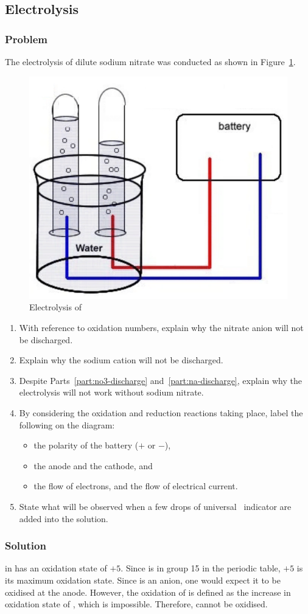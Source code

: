 \documentclass[12pt, a4paper, twoside]{pancake-book}
\begin{document}
\subsection{Electrolysis}
\subsubsection{Problem}
The electrolysis of dilute sodium nitrate was conducted as shown in Figure~\ref{fig:electrolysis-nano3}.
\begin{figure}[htpb]
	\centering
	\includegraphics[width=0.4\linewidth]{assets/09_electrolysis_nano3.png}
	\caption{Electrolysis of }
	\label{fig:electrolysis-nano3}
\end{figure}
\begin{enumerate}
	\item\label{part:no3-discharge} With reference to oxidation numbers, explain why the nitrate anion will not be discharged.
	\item\label{part:na-discharge} Explain why the sodium cation will not be discharged.
	\item Despite Parts~\ref{part:no3-discharge} and~\ref{part:na-discharge}, explain why
	      the electrolysis will not work without sodium nitrate.
	\item By considering the oxidation and reduction reactions taking place, label the following on the diagram:
	      \begin{itemize}
		      \item the polarity of the battery (\(+\) or \(-\)),
		      \item the anode and the cathode, and
		      \item the flow of electrons, and the flow of electrical current.
	      \end{itemize}
	\item State what will be observed when a few drops of universal \pH\ indicator
	      are added into the solution.
\end{enumerate}

\subsubsection{Solution}
 in  has an oxidation state of \(+5\). Since  is in
group 15 in the periodic table, \(+5\) is its maximum oxidation state. Since 
is an anion, one would expect it to be oxidised at the anode. However, the
oxidation of  is defined as the increase in oxidation state of ,
which is impossible. Therefore,  cannot be oxidised.
\end{document}
